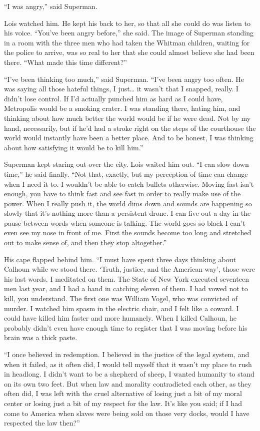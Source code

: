 ``I was angry,'' said Superman.

Lois watched him. He kept his back to her, so that all she could do was
listen to his voice. ``You've been angry before,'' she said. The image
of Superman standing in a room with the three men who had taken the
Whitman children, waiting for the police to arrive, was so real to her
that she could almost believe she had been there. ``What made this time
different?''

``I've been thinking too much,'' said Superman. ``I've been angry too
often. He was saying all those hateful things, I just\ldots{} it wasn't
that I snapped, really. I didn't lose control. If I'd actually punched
him as hard as I could have, Metropolis would be a smoking crater. I was
standing there, hating him, and thinking about how much better the world
would be if he were dead. Not by my hand, necessarily, but if he'd had a
stroke right on the steps of the courthouse the world would instantly
have been a better place. And to be honest, I was thinking about how
satisfying it would be to kill him.''

Superman kept staring out over the city. Lois waited him out. ``I can
slow down time,'' he said finally. ``Not that, exactly, but my
perception of time can change when I need it to. I wouldn't be able to
catch bullets otherwise. Moving fast isn't enough, you have to think
fast and see fast in order to really make use of the power. When I
really push it, the world dims down and sounds are happening so slowly
that it's nothing more than a persistent drone. I can live out a day in
the pause between words when someone is talking. The world goes so black
I can't even see my nose in front of me. First the sounds become too
long and stretched out to make sense of, and then they stop
altogether.''

His cape flapped behind him. ``I must have spent three days thinking
about Calhoun while we stood there. `Truth, justice, and the American
way', those were his last words. I meditated on them. The State of New
York executed seventeen men last year, and I had a hand in catching
eleven of them. I had vowed not to kill, you understand. The first one
was William Vogel, who was convicted of murder. I watched him spasm in
the electric chair, and I felt like a coward. I could have killed him
faster and more humanely. When I killed Calhoun, he probably didn't even
have enough time to register that I was moving before his brain was a
thick paste.

``I once believed in redemption. I believed in the justice of the legal
system, and when it failed, as it often did, I would tell myself that it
wasn't my place to rush in headlong. I didn't want to be a shepherd of
sheep, I wanted humanity to stand on its own two feet. But when law and
morality contradicted each other, as they often did, I was left with the
cruel alternative of losing just a bit of my moral center or losing just
a bit of my respect for the law. It's like you said; if I had come to
America when slaves were being sold on those very docks, would I have
respected the law then?''


